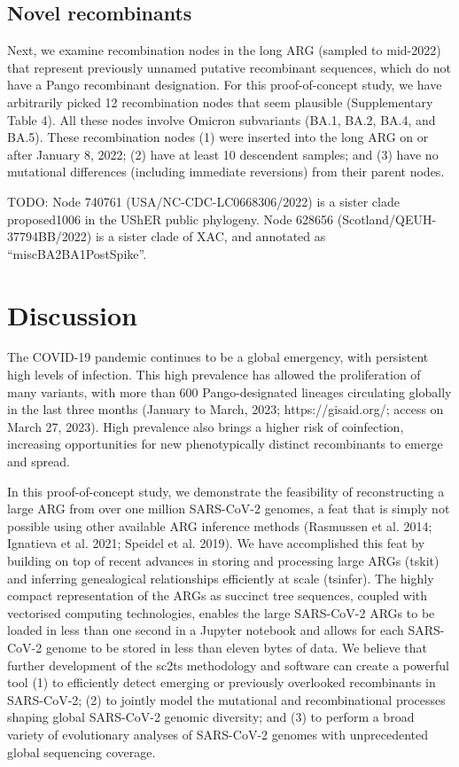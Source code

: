 \documentclass{article}
\begin{document}
\subsection{Novel recombinants}

Next, we examine recombination nodes in the long ARG (sampled to
mid-2022) that represent previously unnamed putative recombinant sequences,
which do not have a Pango recombinant designation. For this proof-of-concept
study, we have arbitrarily picked 12 recombination nodes that seem plausible
(Supplementary Table 4). All these nodes involve Omicron
subvariants (BA.1, BA.2, BA.4, and BA.5). These recombination nodes (1) were
inserted into the long ARG on or after January 8, 2022; (2) have at least 10
descendent samples; and (3) have no mutational differences (including immediate
reversions) from their parent nodes.

TODO: Node  740761 (USA/NC-CDC-LC0668306/2022) is a sister clade proposed1006
in the UShER public phylogeny. Node 628656 (Scotland/QEUH-37794BB/2022) is a
sister clade of XAC, and annotated as ``miscBA2BA1PostSpike''.

\section{Discussion}

The COVID-19 pandemic continues to be a global emergency, with persistent high
levels of infection. This high prevalence has allowed the proliferation of many
variants, with more than 600 Pango-designated lineages circulating globally in
the last three months (January to March, 2023; https://gisaid.org/; access on
March 27, 2023). High prevalence also brings a higher risk of coinfection,
increasing opportunities for new phenotypically distinct recombinants to emerge
and spread.

In this proof-of-concept study, we demonstrate the feasibility of
reconstructing a large ARG from over one million SARS-CoV-2 genomes, a feat
that is simply not possible using other available ARG inference methods
(Rasmussen et al. 2014; Ignatieva et al. 2021; Speidel et al. 2019). We have
accomplished this feat by building on top of recent advances in storing and
processing large ARGs (tskit) and inferring genealogical relationships
efficiently at scale (tsinfer). The highly compact representation of the ARGs
as succinct tree sequences, coupled with vectorised computing technologies,
enables the large SARS-CoV-2 ARGs to be loaded in less than one second in a
Jupyter notebook and allows for each SARS-CoV-2 genome to be stored in less
than eleven bytes of data. We believe that further development of the sc2ts
methodology and software can create a powerful tool (1) to efficiently detect
emerging or previously overlooked recombinants in SARS-CoV-2; (2) to jointly
model the mutational and recombinational processes shaping global SARS-CoV-2
genomic diversity; and (3) to perform a broad variety of evolutionary analyses
of SARS-CoV-2 genomes with unprecedented global sequencing coverage.
\end{document}
